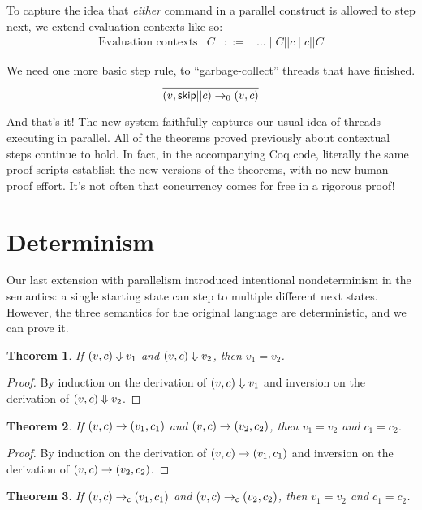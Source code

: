 \documentclass{amsbook}
\newtheorem{theorem}{Theorem}[chapter]
\theoremstyle{definition}
\theoremstyle{remark}
\numberwithin{section}{chapter}
\numberwithin{equation}{chapter}
\begin{document}
To capture the idea that \emph{either} command in a parallel construct is allowed to step next, we extend evaluation contexts like so:
\encoding
$$\begin{array}{rrcl}
  \textrm{Evaluation contexts} & C &::=& \ldots \mid C || c \mid c || C
\end{array}$$

We need one more basic step rule, to ``garbage-collect'' threads that have finished.
$$\infer{\smallstepo{(v, \skipe || c)}{(v, c)}}{}$$

And that's it!
The new system faithfully captures our usual idea of threads executing in parallel.
All of the theorems proved previously about contextual steps continue to hold.
In fact, in the accompanying Coq code, literally the same proof scripts establish the new versions of the theorems, with no new human proof effort.
It's not often that concurrency comes for free in a rigorous proof!


\section{Determinism}

Our last extension with parallelism introduced intentional nondeterminism in the semantics: a single starting state can step to multiple different next states.
However, the three semantics for the original language are deterministic, and we can prove it.

\begin{theorem}
  If $(v, c) \Downarrow v_1$ and $(v, c) \Downarrow v_2$, then $v_1 = v_2$.
\end{theorem}

\begin{proof}
  By induction on the derivation of $(v, c) \Downarrow v_1$ and inversion on the derivation of $(v, c) \Downarrow v_2$.
\end{proof}

\begin{theorem}
  If $(v, c) \to (v_1, c_1)$ and $(v, c) \to (v_2, c_2)$, then $v_1 = v_2$ and $c_1 = c_2$.
\end{theorem}

\begin{proof}
  By induction on the derivation of $(v, c) \to (v_1, c_1)$ and inversion on the derivation of $(v, c) \to (v_2, c_2)$.
\end{proof}

\begin{theorem}
  If $(v, c) \to_\mathsf{c} (v_1, c_1)$ and $(v, c) \to_\mathsf{c} (v_2, c_2)$, then $v_1 = v_2$ and $c_1 = c_2$.
\end{theorem}
\end{document}

